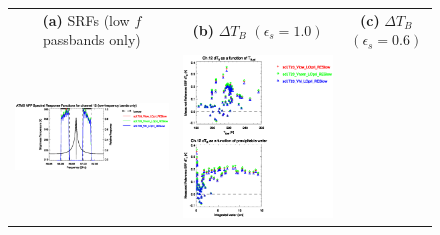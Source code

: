 \begin{figure}[H]
  \centering
  \begin{tabular}{c c c}
    \textsf{\textbf{(a)} SRFs (low $f$ passbands only)} &
    \textsf{\textbf{(b)} $\Delta T_B$ $(\epsilon_s = 1.0)$} &
    \textsf{\textbf{(c)} $\Delta T_B$ $(\epsilon_s = 0.6)$} \\
    \includegraphics[bb=80 400 280 558,clip,scale=0.85]{graphics/srf/Vset/atms_npp.ch12.osrf.eps} &
    \includegraphics[bb=85 400 260 558,clip,scale=0.85]{graphics/dtb/Vset/e1.0_r0.0/atms_npp.ch12.dTb.eps} & 

\end{tabular}
\end{figure}
